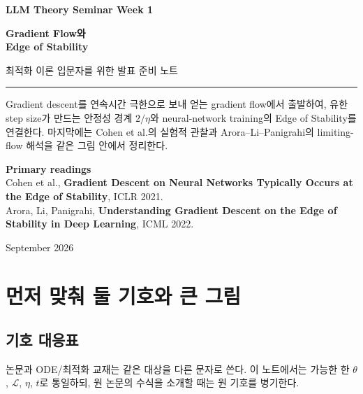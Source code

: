 \documentclass[11pt,a4paper,oneside,openany]{memoir}
\newcommand{\Loss}{\mathcal{L}}
\theoremstyle{definition}
\begin{document}
\begin{titlingpage}
\thispagestyle{empty}
\vspace*{1.2cm}
{\small\bfseries LLM Theory Seminar \hfill Week 1\par}
\vspace{1.4cm}
{\HUGE\bfseries Gradient Flow와\\[0.18em]Edge of Stability\par}
\vspace{0.55cm}
{\large 최적화 이론 입문자를 위한 발표 준비 노트\par}
\vspace{0.9cm}
\rule{\textwidth}{0.7pt}
\vspace{1.1cm}

\begin{minipage}{0.86\textwidth}
\small
Gradient descent를 연속시간 극한으로 보내 얻는 gradient flow에서 출발하여,
유한 step size가 만드는 안정성 경계 $2/\eta$와 neural-network training의
Edge of Stability를 연결한다. 마지막에는 Cohen et al.의 실험적 관찰과
Arora--Li--Panigrahi의 limiting-flow 해석을 같은 그림 안에서 정리한다.
\end{minipage}

\vfill
{\small
\textbf{Primary readings}\\[0.25em]
Cohen et al., \textbf{Gradient Descent on Neural Networks Typically Occurs at the Edge of Stability}, ICLR 2021.\\
Arora, Li, Panigrahi, \textbf{Understanding Gradient Descent on the Edge of Stability in Deep Learning}, ICML 2022.
\par}
\vspace{0.8cm}
{\small September 2026\par}
\end{titlingpage}

\tableofcontents*
\clearpage

\chapter{먼저 맞춰 둘 기호와 큰 그림}

\section{기호 대응표}

논문과 ODE/최적화 교재는 같은 대상을 다른 문자로 쓴다. 이 노트에서는 가능한 한
\(\theta\), \(\Loss\), \(\eta\), \(t\)로 통일하되, 원 논문의 수식을 소개할 때는 원 기호를 병기한다.
\end{document}
